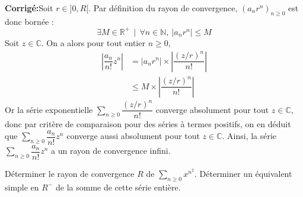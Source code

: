 \documentclass[a4paper,twoside,french,11pt]{VcCours}
\newcommand{\Sum}[2]{\sum_{#1}^{#2}}
\newcommand{\corr}{\textbf{Corrigé:}}
\begin{document}
\corr Soit $r\in ]0,R[$. Par définition du rayon de convergence, $(a_n r^n)_{n \geq 0}$ est donc bornée : 
\[
\exists M\in\mathbb{R}^+\,\mid\, \forall n\in\mathbb{N},\ \vert a_n r^n\vert \leq M
\]
Soit $z\in\mathbb{C}$. On a alors pour tout entier $n \geq 0$,
\begin{align*}
\left\vert \dfrac{a_n}{n!} z^n \right\vert & =\vert a_n r^n\vert \times \left\vert\dfrac{(z/r)^n}{n!}\right\vert \\
&  \leq M\times \left\vert\dfrac{(z/r)^n}{n!}\right\vert
\end{align*}
Or la série exponentielle $\Sum{n \geq 0}{} \dfrac{(z/r)^n}{n!}$ converge absolument pour tout $z\in\mathbb{C}$, donc par critère de comparaison pour des séries à termes positifs, on en déduit que $\Sum{n \geq 0}{} \dfrac{a_n}{n!} z^n$ converge aussi absolument pour tout $z\in\mathbb{C}$. Ainsi, la série $\Sum{n \geq 0}{} \dfrac{a_n}{n!} z^n$ a un rayon de convergence infini.

\begin{Exercice}[$\bigstar$]{} Déterminer le rayon de convergence $R$ de $\sum_{n \geq 0} x^{n^2}$. Déterminer un équivalent simple en $R^{-}$ de la somme de cette série entière.
\end{Exercice}
\end{document}
